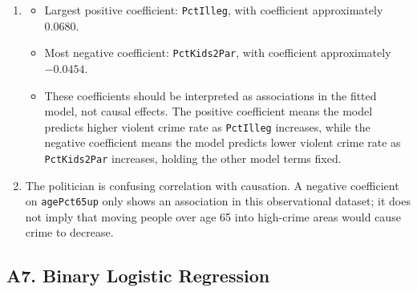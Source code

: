 \documentclass[fleqn]{article}
\begin{document}
\begin{enumerate}[label=(\alph*)]
\item
\begin{itemize}
\item Largest positive coefficient: \texttt{PctIlleg}, with coefficient approximately $0.0680$.
\item Most negative coefficient: \texttt{PctKids2Par}, with coefficient approximately $-0.0454$.
\item These coefficients should be interpreted as associations in the fitted model, not causal effects. The positive coefficient means the model predicts higher violent crime rate as \texttt{PctIlleg} increases, while the negative coefficient means the model predicts lower violent crime rate as \texttt{PctKids2Par} increases, holding the other model terms fixed.
\end{itemize}

\item
The politician is confusing correlation with causation. A negative coefficient on \texttt{agePct65up} only shows an association in this observational dataset; it does not imply that moving people over age 65 into high-crime areas would cause crime to decrease.
\end{enumerate}


\subsection*{A7. Binary Logistic Regression}
\end{document}

